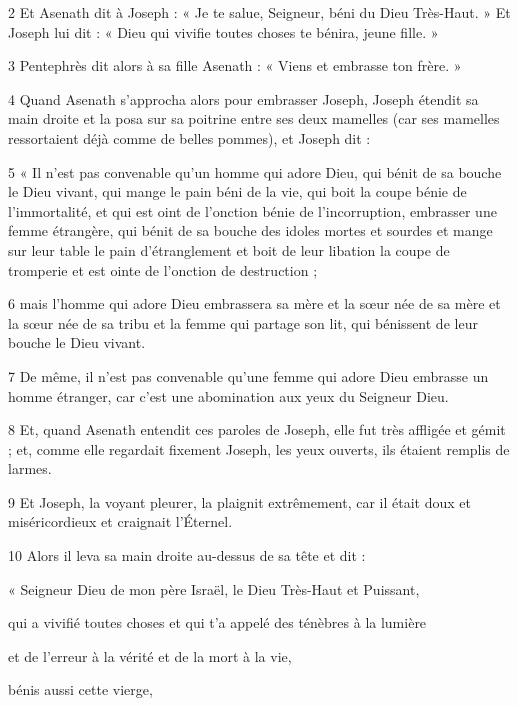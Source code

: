 \par 2 Et Asenath dit à Joseph : « Je te salue, Seigneur, béni du Dieu Très-Haut. » Et Joseph lui dit : « Dieu qui vivifie toutes choses te bénira, jeune fille. »

\par 3 Pentephrès dit alors à sa fille Asenath : « Viens et embrasse ton frère. »

\par 4 Quand Asenath s'approcha alors pour embrasser Joseph, Joseph étendit sa main droite et la posa sur sa poitrine entre ses deux mamelles (car ses mamelles ressortaient déjà comme de belles pommes), et Joseph dit :

\par 5 « Il n'est pas convenable qu'un homme qui adore Dieu, qui bénit de sa bouche le Dieu vivant, qui mange le pain béni de la vie, qui boit la coupe bénie de l'immortalité, et qui est oint de l'onction bénie de l'incorruption, embrasser une femme étrangère, qui bénit de sa bouche des idoles mortes et sourdes et mange sur leur table le pain d'étranglement et boit de leur libation la coupe de tromperie et est ointe de l'onction de destruction ;

\par 6 mais l'homme qui adore Dieu embrassera sa mère et la sœur née de sa mère et la sœur née de sa tribu et la femme qui partage son lit, qui bénissent de leur bouche le Dieu vivant.

\par 7 De même, il n'est pas convenable qu'une femme qui adore Dieu embrasse un homme étranger, car c'est une abomination aux yeux du Seigneur Dieu.

\par 8 Et, quand Asenath entendit ces paroles de Joseph, elle fut très affligée et gémit ; et, comme elle regardait fixement Joseph, les yeux ouverts, ils étaient remplis de larmes.

\par 9 Et Joseph, la voyant pleurer, la plaignit extrêmement, car il était doux et miséricordieux et craignait l'Éternel.

\par 10 Alors il leva sa main droite au-dessus de sa tête et dit :

\par « Seigneur Dieu de mon père Israël, le Dieu Très-Haut et Puissant,
\par qui a vivifié toutes choses et qui t'a appelé des ténèbres à la lumière
\par et de l'erreur à la vérité et de la mort à la vie,
\par bénis aussi cette vierge,

